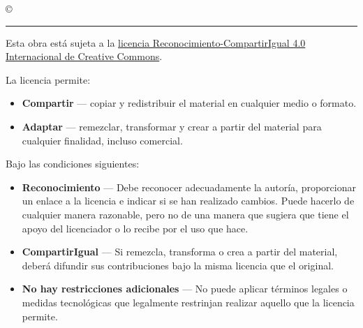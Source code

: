 \thispagestyle{empty}

\hfill

\vfill

\textit{\myTitle} \copyright\ \myTime \myName \\ \bigskip

\par\vspace*{\dimexpr-\parskip-\baselineskip+6pt}
\noindent\rule{\textwidth}{0.5pt}

Esta obra está sujeta a la \hyperlink{https://creativecommons.org/licenses/by-sa/4.0/legalcode}{licencia Reconocimiento-CompartirIgual 4.0 Internacional de Creative Commons}.

La licencia permite:
\begin{itemize}
	\item[] \textbf{Compartir} --- copiar y redistribuir el material en cualquier medio o formato.
	\item[] \textbf{Adaptar} --- remezclar, transformar y crear a partir del material
para cualquier finalidad, incluso comercial.
\end{itemize}

Bajo las condiciones siguientes:
\begin{itemize}
	\item[] \textbf{Reconocimiento} --- Debe reconocer adecuadamente la autoría, proporcionar un enlace a la licencia e indicar si se han realizado cambios. Puede hacerlo de cualquier manera razonable, pero no de una manera que sugiera que tiene el apoyo del licenciador o lo recibe por el uso que hace. 
	\item[] \textbf{CompartirIgual} --- Si remezcla, transforma o crea a partir del material, deberá difundir sus contribuciones bajo la misma licencia que el original.
	\item[] \textbf{No hay restricciones adicionales} --- No puede aplicar términos legales o medidas tecnológicas que legalmente restrinjan realizar aquello que la licencia permite.
\end{itemize}
\clearpage
